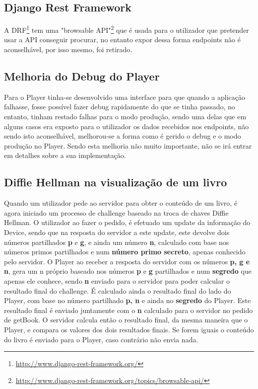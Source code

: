 \documentclass[pdftex,12pt,a4paper]{report}
\begin{document}
\subsection{Django Rest Framework}
A DRF\footnote{\label{url1} \url{http://www.django-rest-framework.org/}} tem uma "browsable API"\footnote{\label{url1} \url{http://www.django-rest-framework.org/topics/browsable-api/}} que é usada para o utilizador que pretender  usar a API conseguir procurar, no entanto expor dessa forma endpoints não é aconselhável, por isso mesmo, foi retirado.

\subsection{Melhoria do Debug do Player}
Para o Player tinha-se desenvolvido uma interface para que quando a aplicação falhasse, fosse possível fazer debug rapidamente do que se tinha passado, no entanto, tinham restado falhas para o modo produção, sendo uma delas que em alguns casos era exposto para o utilizador os dados recebidos nos endpoints, não sendo isto aconselhável, melhorou-se a forma como é gerido o debug e o modo produção no Player. Sendo esta melhoria não muito importante, não se irá entrar em detalhes sobre a sua implementação.

\subsection{Diffie Hellman na visualização de um livro}

Quando um utilizador pede ao servidor para obter o conteúdo de um livro, é agora iniciado um processo de challenge baseado na troca de chaves Diffie Hellman. O utilizador ao fazer o pedido, é efetuado um update da informação do Device, sendo que na resposta do servidor a este update, este devolve dois números partilhados \textbf{p} e \textbf{g}, e ainda um número \textbf{n}, calculado com base nos números primos partilhados e num \textbf{número primo secreto}, apenas conhecido pelo servidor.
O Player ao receber a resposta do servidor com os números \textbf{p, g e n}, gera um n próprio baseado nos números \textbf{p} e \textbf{g} partilhados e num \textbf{segredo} que apenas ele conhece, sendo \textbf{n} enviado para o servidor para poder calcular o resultado final do challenge. É calculado ainda o resultado final do lado do Player, com base no número partilhado \textbf{p, n} e ainda no \textbf{segredo} do Player. Este resultado final é enviado juntamente com o \textbf{n} calculado para o servidor no pedido de getBook.
O servidor calcula então o resultado final, da mesma maneira que o Player, e compara os valores dos dois resultados finais. Se forem iguais o conteúdo do livro é enviado para o Player, caso contrário não envia nada.
\end{document}
